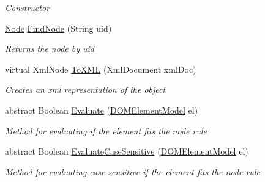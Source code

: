 \begin{DoxyCompactItemize}
\begin{DoxyCompactList}\small\item\em Constructor \end{DoxyCompactList}\item 
\hyperlink{class_web_analyzer_1_1_models_1_1_settings_model_1_1_expression_tree_1_1_node}{Node} \hyperlink{class_web_analyzer_1_1_models_1_1_settings_model_1_1_expression_tree_1_1_node_a603b5439f3109a1d8718bb2a879c36b9}{Find\+Node} (String uid)
\begin{DoxyCompactList}\small\item\em Returns the node by uid \end{DoxyCompactList}\item 
virtual Xml\+Node \hyperlink{class_web_analyzer_1_1_models_1_1_settings_model_1_1_expression_tree_1_1_node_afd5fd3184ae6075feac0012977e349b6}{To\+X\+M\+L} (Xml\+Document xml\+Doc)
\begin{DoxyCompactList}\small\item\em Creates an xml representation of the object \end{DoxyCompactList}\item 
abstract Boolean \hyperlink{class_web_analyzer_1_1_models_1_1_settings_model_1_1_expression_tree_1_1_node_aa07f08b4a2299c2b9752a1eba59e245d}{Evaluate} (\hyperlink{class_web_analyzer_1_1_models_1_1_data_model_1_1_d_o_m_element_model}{D\+O\+M\+Element\+Model} el)
\begin{DoxyCompactList}\small\item\em Method for evaluating if the element fits the node rule \end{DoxyCompactList}\item 
abstract Boolean \hyperlink{class_web_analyzer_1_1_models_1_1_settings_model_1_1_expression_tree_1_1_node_a5cf0b866812c017ef1d0feb5f594499e}{Evaluate\+Case\+Sensitive} (\hyperlink{class_web_analyzer_1_1_models_1_1_data_model_1_1_d_o_m_element_model}{D\+O\+M\+Element\+Model} el)
\begin{DoxyCompactList}\small\item\em Method for evaluating case sensitive if the element fits the node rule \end{DoxyCompactList}\end{DoxyCompactItemize}
